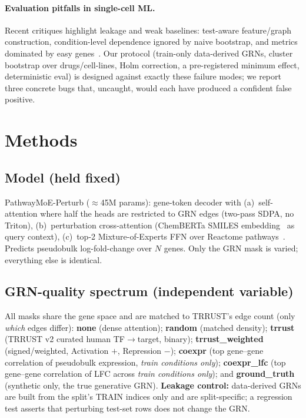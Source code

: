 \documentclass[11pt]{article}
\begin{document}
\paragraph{Evaluation pitfalls in single-cell ML.} Recent critiques highlight leakage and weak
baselines: test-aware feature/graph construction, condition-level dependence ignored by naive bootstrap,
and metrics dominated by easy genes~\cite{leakage_critique}. Our protocol (train-only data-derived GRNs,
cluster bootstrap over drugs/cell-lines, Holm correction, a pre-registered minimum effect, deterministic
eval) is designed against exactly these failure modes; we report three concrete bugs that, uncaught,
would each have produced a confident false positive.

\section{Methods}
\subsection{Model (held fixed)}
PathwayMoE-Perturb ($\approx$45M params): gene-token decoder with (a)~self-attention where half the
heads are restricted to GRN edges (two-pass SDPA, no Triton), (b)~perturbation cross-attention
(ChemBERTa SMILES embedding~\cite{chemberta} as query context), (c)~top-2 Mixture-of-Experts FFN over
Reactome pathways~\cite{reactome}. Predicts pseudobulk log-fold-change over $N$ genes. Only the GRN mask
is varied; everything else is identical.

\subsection{GRN-quality spectrum (independent variable)}
All masks share the gene space and are matched to TRRUST's edge count (only \emph{which} edges differ):
\textbf{none} (dense attention); \textbf{random} (matched density); \textbf{trrust} (TRRUST v2 curated
human TF$\rightarrow$target, binary); \textbf{trrust\_weighted} (signed/weighted, Activation $+$,
Repression $-$); \textbf{coexpr} (top gene--gene correlation of pseudobulk expression, \emph{train
conditions only}); \textbf{coexpr\_lfc} (top gene--gene correlation of LFC across \emph{train conditions
only}); and \textbf{ground\_truth} (synthetic only, the true generative GRN).
\textbf{Leakage control:} data-derived GRNs are built from the split's TRAIN indices only and are
split-specific; a regression test asserts that perturbing test-set rows does not change the GRN.
\end{document}
